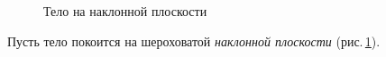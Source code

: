 \documentclass[main.tex]{subfiles}
\begin{document}
{%
\setlength\intextsep{0pt}
\begin{figure}
    \centering
    \caption{Тело на наклонной плоскости}
    \label{fig:p41}
\end{figure}


Пусть тело покоится на шероховатой \emph{наклонной плоскости} (рис.\,\ref{fig:p41}). 





    










}
\end{document}
